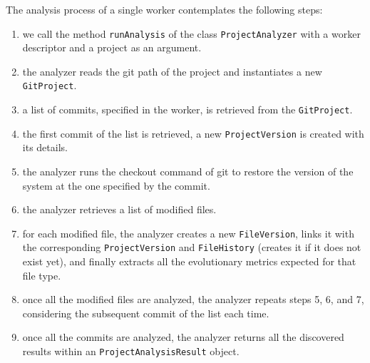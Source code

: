 The analysis process of a single worker contemplates the following steps:
\begin{enumerate}
    \item we call the method \texttt{runAnalysis} of the class \texttt{ProjectAnalyzer} with a worker descriptor and a project as an argument. 
    \item the analyzer reads the git path of the project and instantiates a new \texttt{GitProject}. 
    \item a list of commits, specified in the worker, is retrieved from the \texttt{GitProject}.
    \item the first commit of the list is retrieved, a new \texttt{ProjectVersion} is created with its details. 
    \item the analyzer runs the checkout command of git to restore the version of the system at the one specified by the commit. 
    \item the analyzer retrieves a list of modified files. 
    \item for each modified file, the analyzer creates a new \texttt{FileVersion}, links it with the corresponding  \texttt{ProjectVersion} and \texttt{FileHistory} (creates it if it does not exist yet), and finally extracts all the evolutionary metrics expected for that file type.
    \item once all the modified files are analyzed, the analyzer repeats steps 5, 6, and 7, considering the subsequent commit of the list each time. 
    \item once all the commits are analyzed, the analyzer returns all the discovered results within an \texttt{ProjectAnalysisResult} object. 
\end{enumerate}

